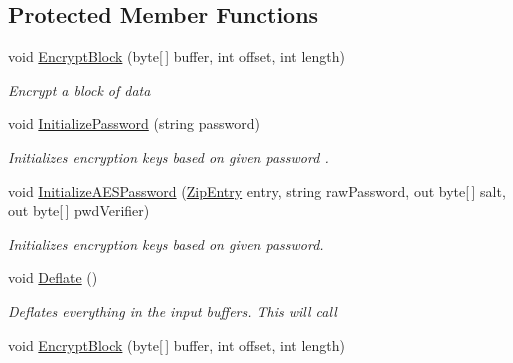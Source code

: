 \subsection*{Protected Member Functions}
\begin{DoxyCompactItemize}
\item 
void \hyperlink{class_i_c_sharp_code_1_1_sharp_zip_lib_1_1_zip_1_1_compression_1_1_streams_1_1_deflater_output_stream_a825d9fa5b1827d701c93aabbdb0f2ab0}{Encrypt\+Block} (byte\mbox{[}$\,$\mbox{]} buffer, int offset, int length)
\begin{DoxyCompactList}\small\item\em Encrypt a block of data \end{DoxyCompactList}\item 
void \hyperlink{class_i_c_sharp_code_1_1_sharp_zip_lib_1_1_zip_1_1_compression_1_1_streams_1_1_deflater_output_stream_a28127c5846671a1e94619d7ddf99d7a0}{Initialize\+Password} (string password)
\begin{DoxyCompactList}\small\item\em Initializes encryption keys based on given {\itshape password} . \end{DoxyCompactList}\item 
void \hyperlink{class_i_c_sharp_code_1_1_sharp_zip_lib_1_1_zip_1_1_compression_1_1_streams_1_1_deflater_output_stream_aae228656b40af100d087c13007826507}{Initialize\+A\+E\+S\+Password} (\hyperlink{class_i_c_sharp_code_1_1_sharp_zip_lib_1_1_zip_1_1_zip_entry}{Zip\+Entry} entry, string raw\+Password, out byte\mbox{[}$\,$\mbox{]} salt, out byte\mbox{[}$\,$\mbox{]} pwd\+Verifier)
\begin{DoxyCompactList}\small\item\em Initializes encryption keys based on given password. \end{DoxyCompactList}\item 
void \hyperlink{class_i_c_sharp_code_1_1_sharp_zip_lib_1_1_zip_1_1_compression_1_1_streams_1_1_deflater_output_stream_acc6796fde3f52f8d178fcb1cb3bf7085}{Deflate} ()
\begin{DoxyCompactList}\small\item\em Deflates everything in the input buffers. This will call \end{DoxyCompactList}\item 
void \hyperlink{class_i_c_sharp_code_1_1_sharp_zip_lib_1_1_zip_1_1_compression_1_1_streams_1_1_deflater_output_stream_a825d9fa5b1827d701c93aabbdb0f2ab0}{Encrypt\+Block} (byte\mbox{[}$\,$\mbox{]} buffer, int offset, int length)

\end{DoxyCompactItemize}
